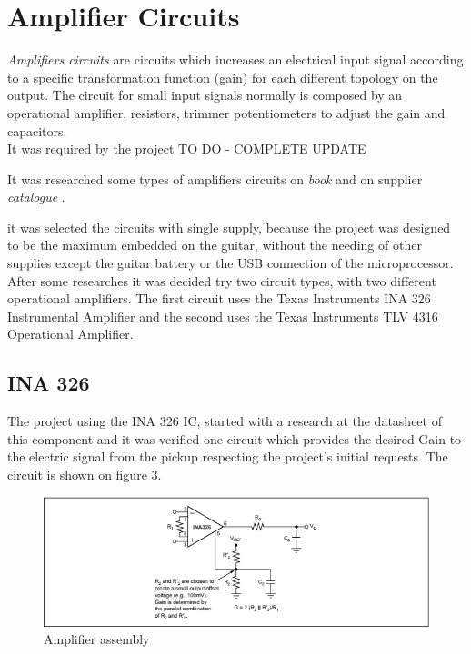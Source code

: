 \chapter{Amplifier Circuits}
\textit{Amplifiers circuits} \cite{amplifier-circuit} are circuits which increases an electrical input signal according
to a specific transformation function (gain) for each different topology on the output. The circuit for small input signals
normally is composed by an operational amplifier, resistors, trimmer potentiometers to adjust the gain and capacitors.\\

It was required by the project TO DO - COMPLETE UPDATE


It was researched some types of amplifiers circuits on \textit{book} \cite{Milmann} and on supplier \textit{catalogue} \cite{OpAmps}.

it was selected the circuits
with single supply, because the project was designed to be the maximum embedded
on the guitar, without the needing of other supplies except the guitar battery
or the USB connection of the microprocessor.
After some researches it was decided try two circuit types, with two different
operational amplifiers. The first circuit uses the Texas Instruments INA 326
Instrumental Amplifier and the second uses the Texas Instruments TLV 4316 Operational Amplifier.

\section{INA 326}
The project using the INA 326 IC, started with a research at the datasheet of
this component and it was verified one circuit which provides the desired Gain to
the electric signal from the pickup respecting the project's initial requests.
The circuit is shown on figure 3.

\begin{figure}[!htpb]
\centering
\includegraphics[scale=0.8]{images/Texas}
\caption{Amplifier assembly}
\end{figure}

